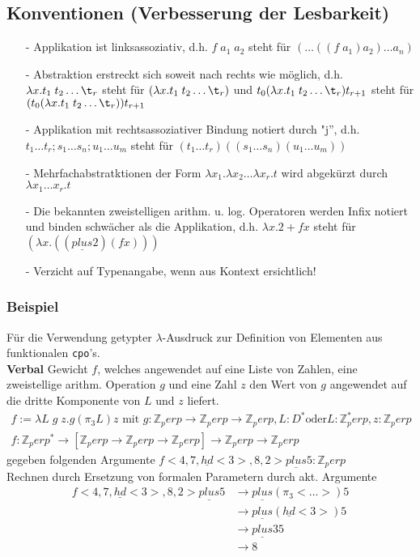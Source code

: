 \subsection{Konventionen (Verbesserung der Lesbarkeit)}
\begin{itemize}
\item[-] Applikation ist linksassoziativ, d.h. $f \; a_1 \; a_2$ steht für $(\dots((f\;a_1)a_2)\dots a_n)$
\item[-] Abstraktion erstreckt sich soweit nach rechts wie möglich, d.h. $\lambda x. t_1 \; t_2 \dots \t_r$ steht für $(\lambda x. t_1 \; t_2 \dots \t_r)$ und $t_0 (\lambda x. t_1 \; t_2 \dots \t_r) t_{r+1}$ steht für $(t_0 (\lambda x. t_1 \; t_2 \dots \t_r) ) t_{r+1}$
\item[-] Applikation mit rechtsassoziativer Bindung notiert durch "j'', d.h. $t_1 \dots t_r; s_1 \dots s_n; u_1 \dots u_m$ steht für $(t_1 \dots t_r) ((s_1 \dots s_n)( u_1 \dots u_m))$
\item[-] Mehrfachabstratktionen der Form $\lambda x_1.\lambda x_2 \dots \lambda x_r.t$ wird abgekürzt durch $\lambda x_1 \dots x_r . t$
\item[-] Die bekannten zweistelligen arithm. u. log. Operatoren werden Infix notiert und binden schwächer als die Applikation, d.h. $\lambda x. 2 + f x$ steht für $(\lambda x.((\underline{plus} 2)(f x)))$
\item[-] Verzicht auf Typenangabe, wenn aus Kontext ersichtlich!
\end{itemize}

\subsubsection*{Beispiel} 
Für die Verwendung getypter $\lambda$-Ausdruck zur Definition von Elementen aus funktionalen \lstinline!cpo!'s.\\
\textbf{Verbal} Gewicht $f$, welches angewendet auf eine Liste von Zahlen, eine zweistellige arithm. Operation $g$ und eine Zahl $z$ den Wert von $g$ angewendet auf die dritte Komponente von $L$ und $z$ liefert.\\
\begin{align*}
f:=\lambda L\; g \;z . g (\pi_3 L) z \text{ mit } g : \mathbb{Z}_perp \rightarrow \mathbb{Z}_perp \rightarrow \mathbb{Z}_perp, L : D^* \text{oder} L : \mathbb{Z}^*_perp, z : \mathbb{Z}_perp\\
f : \mathbb{Z}_perp^* \rightarrow [\mathbb{Z}_perp \rightarrow \mathbb{Z}_perp \rightarrow \mathbb{Z}_perp] \rightarrow \mathbb{Z}_perp \rightarrow \mathbb{Z}_perp
\end{align*}
gegeben folgenden Argumente $f <4, 7, \underline{hd}<3>, 8, 2> \underline{plus} 5 : \mathbb{Z}_perp $ \\
Rechnen durch Ersetzung von formalen Parametern durch akt. Argumente
\begin{align*}
f <4, 7, \underline{hd}<3>, 8, 2> \underline{plus} 5 &\rightarrow \underline{plus} (\pi_3 <\dots>) 5 \\
&\rightarrow \underline{plus} (\underline{hd}<3>) 5 \\
&\rightarrow \underline{plus} 3 5 \\
& \rightarrow 8\\
\end{align*}
